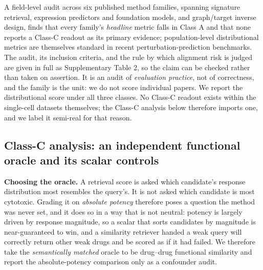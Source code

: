 \documentclass[11pt,letterpaper]{article}
\begin{document}
A field-level audit across six published method families, spanning signature
retrieval\cite{ref1,ref2,ref3}, expression predictors and foundation
models\cite{ref4,ref5,ref6,ref7,ref8,ref9}, and graph/target inverse
design\cite{ref10,ref11,ref12}, finds that every family's \emph{headline} metric falls in Class A
and that none reports a Class-C readout as its primary evidence; population-level distributional
metrics are themselves standard in recent perturbation-prediction benchmarks\cite{ref15}. The
audit, its inclusion criteria, and the rule by which alignment risk is judged are given in full as
Supplementary Table 2, so the claim can be checked rather than taken on assertion. It is an audit
of \emph{evaluation practice}, not of correctness, and the family is the unit: we do not score
individual papers. We report the distributional score under all three classes. No Class-C readout exists within the
single-cell datasets themselves; the Class-C analysis below therefore imports one, and we label it
semi-real for that reason.

\subsection*{Class-C analysis: an independent functional oracle and its scalar controls}

\textbf{Choosing the oracle.} A retrieval score is asked which candidate's response distribution
most resembles the query's. It is not asked which candidate is most cytotoxic. Grading it on
\emph{absolute potency} therefore poses a question the method was never set, and it does so in a
way that is not neutral: potency is largely driven by response magnitude, so a scalar that sorts
candidates by magnitude is near-guaranteed to win, and a similarity retriever handed a weak query
will correctly return other weak drugs and be scored as if it had failed. We therefore take the
\emph{semantically matched} oracle to be drug--drug functional similarity and report the
absolute-potency comparison only as a confounder audit.
\end{document}
